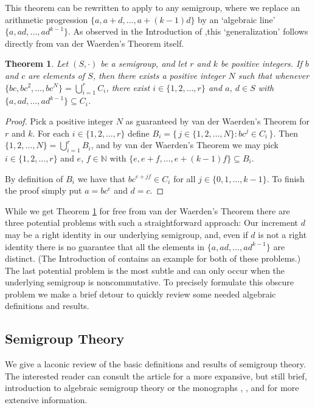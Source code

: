 \documentclass[12pt,showtrims]{memoir}
\theoremstyle{plain}
\newtheorem{thm}{Theorem}[section]
\theoremstyle{definition}
\newcommand{\bbN}{\mathbb{N}}
\begin{document}
This theorem can be rewritten to apply to any semigroup, where we replace an arithmetic progression $\{a, a+d, ..., a+(k-1)d\}$ by an `algebraic line' $\{a, ad, ..., ad^{k-1}\}$. As observed in the Introduction of \cite{Bergelson:1992fk},this `generalization' follows directly from van der Waerden's Theorem itself. 

\begin{thm}
  \label{thm:semigrp-vdw}
  Let $(S, \cdot)$ be a semigroup, and let $r$ and $k$ be positive integers.
  If $b$ and $c$ are elements of $S$, then there exists a positive integer $N$ such that whenever $\{bc, bc^2, \ldots, bc^N\} = \bigcup_{i=1}^r C_i$, there exist $i \in \{1, 2, \ldots, r\}$ and $a$, $d \in S$ with $\{a, ad, \ldots, ad^{k-1}\} \subseteq C_i$.
\end{thm}
\begin{proof}
  Pick a positive integer $N$ as guaranteed by van der Waerden's Theorem for $r$ and $k$.
  For each $i \in \{1, 2, \ldots, r\}$ define $B_i = \bigl\{\, j \in \{1, 2, \ldots, N\} : bc^j \in C_i \,\bigr\}$.
  Then $\{1, 2, \ldots, N\} = \bigcup_{i=1}^r B_i$, and by van der Waerden's Theorem we may pick $i \in \{1, 2, \ldots, r\}$ and $e$, $f \in \bbN$ with $\{e, e+f, \ldots, e+(k-1)f\} \subseteq B_i$.
  
  By definition of $B_i$ we have that $bc^{e+jf} \in C_i$ for all $j \in \{0, 1, \ldots, k-1\}$.
  To finish the proof simply put $a = bc^e$ and $d = c$.
\end{proof}

While we get Theorem \ref{thm:semigrp-vdw} for free from van der Waerden's Theorem there are three potential problems with such a straightforward approach:
Our increment $d$ may be a right identity in our underlying semigroup, and, even if $d$ is not a right identity there is no guarantee that all the elements in $\{a, ad, \ldots, ad^{k-1}\}$ are distinct.
(The Introduction of \cite{Bergelson:1992fk} contains an example for both of these problems.)
The last potential problem is the most subtle and can only occur when the underlying semigroup is noncommutative.
To precisely formulate this obscure problem we make a brief detour to quickly review some needed algebraic definitions and results.

\subsection{Semigroup Theory}
We give a laconic review of the basic definitions and results of semigroup theory.
The interested reader can consult the article \cite{Hollings:2007uq} for a more expansive, but still brief, introduction to algebraic semigroup theory or the monographs \cite{Clifford:1961fk}, \cite{Clifford:1967fk}, and \cite[Chapter 1]{Hindman:1998fk} for more extensive information. 
\end{document}
